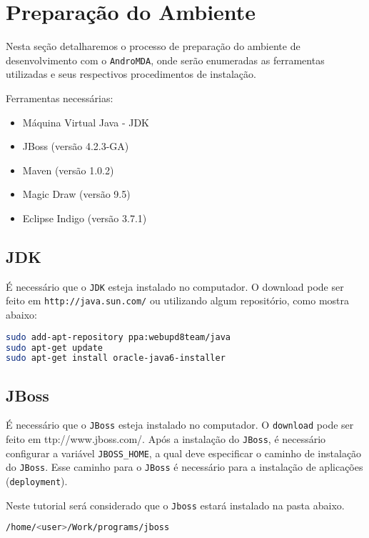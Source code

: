 \chapter{Preparação do Ambiente}

Nesta seção detalharemos o processo de preparação do ambiente de desenvolvimento
com o \texttt{AndroMDA}, onde serão enumeradas as ferramentas utilizadas e seus
respectivos procedimentos de instalação.

Ferramentas necessárias:
\begin{itemize}
  \item Máquina Virtual Java - JDK
  \item JBoss (versão 4.2.3-GA)
  \item Maven (versão 1.0.2) 
  \item Magic Draw (versão 9.5)
  \item Eclipse Indigo (versão 3.7.1)
\end{itemize}

\section{JDK}

É necessário que o \texttt{JDK} esteja instalado no computador. O
download pode ser feito em \texttt{http://java.sun.com/} ou utilizando
algum repositório, como mostra abaixo:

\begin{lstlisting}[language=bash]
sudo add-apt-repository ppa:webupd8team/java
sudo apt-get update
sudo apt-get install oracle-java6-installer
\end{lstlisting}

\section{JBoss}

É necessário que o \texttt{JBoss} esteja instalado no computador. O
\texttt{download} pode ser feito em
\hypertarget{ttp://www.jboss.com/}{ttp://www.jboss.com/}. Após a instalação do
\texttt{JBoss}, é necessário configurar a variável \texttt{JBOSS\_HOME}, a qual
deve especificar o caminho de instalação do \texttt{JBoss}. Esse caminho para o
\texttt{JBoss} é necessário para a instalação de aplicações
(\texttt{deployment}).

Neste tutorial será considerado que o \texttt{Jboss} estará instalado na pasta
abaixo.

\begin{lstlisting}[language=bash]
/home/<user>/Work/programs/jboss
\end{lstlisting}

